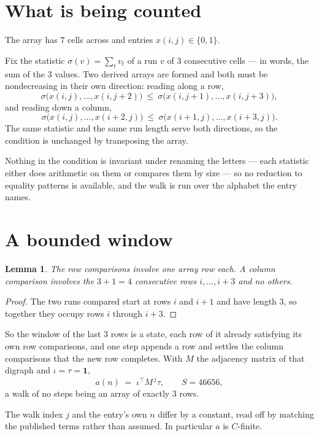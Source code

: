 \documentclass[11pt,a4paper]{article}
\theoremstyle{plain}
\newtheorem{lemma}[theorem]{Lemma}
\theoremstyle{definition}
\begin{document}
\section{What is being counted}

The array has $7$ cells across and entries $x(i,j)\in\{0,1\}$.

Fix the statistic $\sigma(v)=\sum_{t} v_t$ of a run $v$ of $3$ consecutive cells --- in words,
the sum of the $3$ values. Two derived arrays are formed and both must be
nondecreasing in their own direction: reading along a row,
\[
\sigma\bigl(x(i,j),\dots,x(i,j{+}2)\bigr)\ \le\
\sigma\bigl(x(i,j{+}1),\dots,x(i,j{+}3)\bigr),
\]
and reading down a column,
\[
\sigma\bigl(x(i,j),\dots,x(i{+}2,j)\bigr)\ \le\
\sigma\bigl(x(i{+}1,j),\dots,x(i{+}3,j)\bigr).
\]
The same statistic and the same run length serve both directions, so the condition is
unchanged by transposing the array.

Nothing in the condition is invariant under renaming the letters --- each statistic either does
arithmetic on them or compares them by size --- so no reduction to equality patterns is
available, and the walk is run over the alphabet the entry names.

\section{A bounded window}

\begin{lemma}\label{lem:win}
The row comparisons involve one array row each. A column comparison involves the
$3+1=4$ consecutive rows $i,\dots,i{+}3$ and no others.
\end{lemma}

\begin{proof}
The two runs compared start at rows $i$ and $i+1$ and have length $3$, so together they
occupy rows $i$ through $i+3$.
\end{proof}

So the window of the last $3$ rows is a state, each row of it already satisfying its own row
comparisons, and one step appends a row and settles the column comparisons that the new row
completes. With $M$ the adjacency matrix of that digraph and $\iota=\tau=\mathbf{1}$,
\[
a(n)\;=\;\iota^{\!\top}M^{\,j}\tau ,\qquad S=46656,
\]
a walk of no steps being an array of exactly $3$ rows.

The walk index $j$ and the entry's own $n$ differ by a constant, read off by matching the
published terms rather than assumed. In particular $a$ is $C$-finite.
\end{document}
